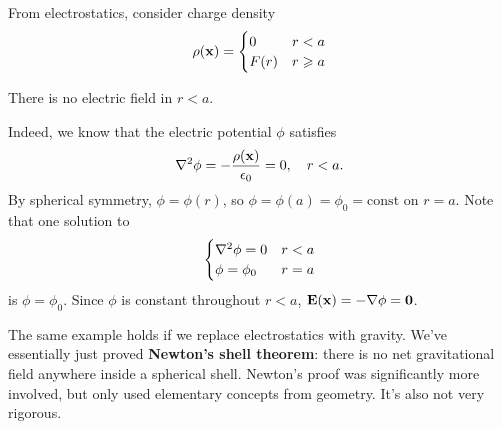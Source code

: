 \begin{example}
    From electrostatics, consider charge density
    \[
        \rho({\bf x}) = \begin{cases}
        0 &r<a\\
        F(r) &r\geqslant a\\
        \end{cases} 
    \]
    \begin{claim}
        There is no electric field in $ r<a $.
    \end{claim}
    Indeed, we know that the electric potential $ \phi $ satisfies 
    \[
        \laplacian \phi = -\frac{\rho(\bfx)}{\epsilon_0}=0,\quad r<a.
    \]
    By spherical symmetry, $ \phi=\phi(r) $, so $ \phi=\phi(a)=\phi_0=\text{const} $ on $ r=a $. Note that one solution to 
    \[
        \begin{cases}
        \laplacian \phi=0 &r<a\\
        \phi=\phi_0 &r=a\\
        \end{cases} 
    \]
    is $ \phi=\phi_0 $. Since $\phi$ is constant throughout $r < a$, ${\bf E}({\bf x}) = - \nabla \phi= \mathbf{0}$.
\end{example}

The same example holds if we replace electrostatics with gravity. We’ve essentially just proved \textbf{Newton’s shell theorem}: there is no net gravitational field anywhere inside a spherical shell. Newton’s proof was significantly more involved, but only used elementary concepts from geometry. It’s also not very rigorous.